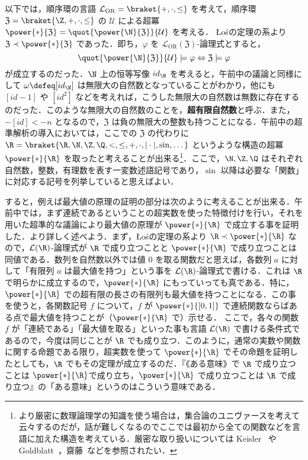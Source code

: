 \documentclass[a4j,xelatex,ja=standard]{ltjsarticle}
\newcommand{\Los}{{\L}o\'{s}}
\begin{document}
以下では，順序環の言語 $\mathcal{L}_{\mathrm{OR}} = \braket{+, \cdot, \leq}$ を考えて，順序環 $\mathfrak{Z} = \braket{\Z, +, \cdot, \leq}$ の $\mathcal{U}$ による超冪 $\power{*}{\mathfrak{Z}} = \quot{\power{\N}{\mathfrak{Z}}}{\mathcal{U}}$ を考える．
\Los の定理の系より $\mathfrak{Z} \prec \power{*}{\mathfrak{Z}}$ であった．即ち，$\varphi$ を $\mathcal{L}_{\mathrm{OR}}(\mathfrak{Z})$-論理式とすると，
\[
 \quot{\power{\N}{\mathfrak{Z}}}{\mathcal{U}} \models \varphi
 \Leftrightarrow \mathfrak{Z} \models \varphi
\]
が成立するのだった．$\N$ 上の恒等写像 $id_\N$ を考えると，午前中の議論と同様にして $\omega \defeq [id_\N]$ は無限大の自然数となっていることがわかり，他にも $[id - 1]$ や $[id^2]$ などを考えれば，こうした無限大の自然数は無数に存在するのだった．このような無限大の自然数のことを，{\bfseries 超有限自然数}と呼ぶ．また， $-[id] < -n$ となるので，$\mathfrak{Z}$ は負の無限大の整数も持つことになる．午前中の超準解析の導入においては，ここでの $\mathfrak{Z}$ の代わりに $\R = \braket{\R, \N, \Z, \Q, <, \leq, +, \cdot , |\cdot|, \sin, \dots}$ というような構造の超冪 $\power{*}{\R}$ を取ったと考えることが出来る\footnote{より厳密に数理論理学の知識を使う場合は，集合論のユニヴァースを考えて云々するのだが，話が難しくなるのでここでは最初から全ての関数などを言語に加えた構造を考えている．厳密な取り扱いについては Keisler~\cite{Keisler} や Goldblatt~\cite{Goldblatt}，齋藤~\cite{Saito}などを参照されたい．}．ここで，$\N, \Z, \Q$ はそれぞれ自然数，整数，有理数を表す一変数述語記号であり，$\sin$ 以降は必要な「関数」に対応する記号を列挙していると思えばよい．

すると，例えば最大値の原理の証明の部分は次のように考えることが出来る．午前中では，まず連続であるということの超実数を使った特徴付けを行い，それを用いた超準的な議論により最大値の原理が $\power{*}{\R}$ で成立する事を証明した．より詳しく述べよう．まず，\Los の定理の系より $\R \prec \power{*}{\R}$ なので，$\mathcal{L}(\R)$-論理式が $\R$ で成り立つことと $\power{*}{\R}$ で成り立つことは同値である．数列を自然数以外では値 $0$ を取る関数だと思えば，各数列 $a$ に対して「有限列 $a$ は最大値を持つ」という事を $\mathcal{L}(\R)$-論理式で書ける．これは $\R$ で明らかに成立するので，$\power{*}{\R}$ にもっていっても真である．特に，$\power{*}{\R}$ での超有限の長さの有限列も最大値を持つことになる．この事を使うと，各関数記号 $f$ について，$f$ が $\power{*}{[0,1]}$ で連続関数ならばある点で最大値を持つことが（$\power{*}{\R}$ で）示せる．
ここで，各々の関数 $f$ が「連続である」「最大値を取る」といった事も言語 $\mathcal{L}(\R)$ で書ける条件式であるので，今度は同じことが $\R$ でも成り立つ．このように，通常の実数や関数に関する命題である限り，超実数を使って $\power{*}{\R}$ でその命題を証明したとしても，$\R$ でもその定理が成立するのだ．『《ある意味》で $\R$ で成り立つことは $\power{*}{\R}$で成り立ち，$\power{*}{\R}$ で成り立つことは $\R$ で成り立つ』の「ある意味」というのはこういう意味である．
\end{document}
